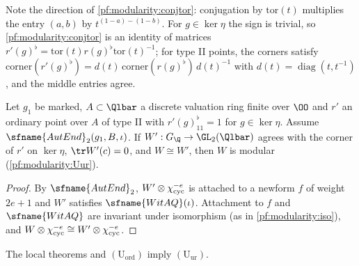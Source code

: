 Note the direction of \eqref{pf:modularity:conjtor}: conjugation by $\mathrm{tor}(t)$ multiplies the entry $(a,b)$ by
$t^{(1-a)-(1-b)}$. For $g\in\ker\eta$ the sign is trivial, so \eqref{pf:modularity:conjtor} is an identity of matrices
$r'(g)^\flat=\mathrm{tor}(t)r(g)^\flat\mathrm{tor}(t)^{-1}$; for type II points, the corners satisfy
$\mathrm{corner}(r'(g)^\flat)=d(t)\,\mathrm{corner}(r(g)^\flat)\,d(t)^{-1}$ with $d(t)=\operatorname{diag}(t,t^{-1})$, and
the middle entries agree.

\begin{lemma}\label{pf:modularity:modend}
Let $g_1$ be marked, $A\subset\Qlbar$ a discrete valuation ring finite over $\OO$ and $r'$ an ordinary point over $A$
of type II with $r'(g)^\flat_{11}=1$ for $g\in\ker\eta$. Assume $\sfname{AutEnd}_2(g_1,B,\iota)$. If
$W':G_\Q\to\GL_2(\Qlbar)$ agrees with the corner of $r'$ on $\ker\eta$, $\tr W'(c)=0$, and $W\cong W'$, then $W$ is
modular (\cref{pf:modularity:Uur}).
\end{lemma}

\begin{proof}
By $\sfname{AutEnd}_2$, $W'\otimes\chi_{\mathrm{cyc}}^{-e}$ is attached to a newform $f$ of weight $2e+1$ and $W'$
satisfies $\sfname{WitAQ}(\iota)$. Attachment to $f$ and $\sfname{WitAQ}$ are invariant under isomorphism (as in
\cref{pf:modularity:iso}), and $W\otimes\chi_{\mathrm{cyc}}^{-e}\cong W'\otimes\chi_{\mathrm{cyc}}^{-e}$.
\end{proof}

\begin{theorem}\label{pf:modularity:unr-kisin}
The local theorems and $(\mathrm{U}_{\mathrm{ord}})$ imply $(\mathrm{U}_{\mathrm{ur}})$.
\end{theorem}

